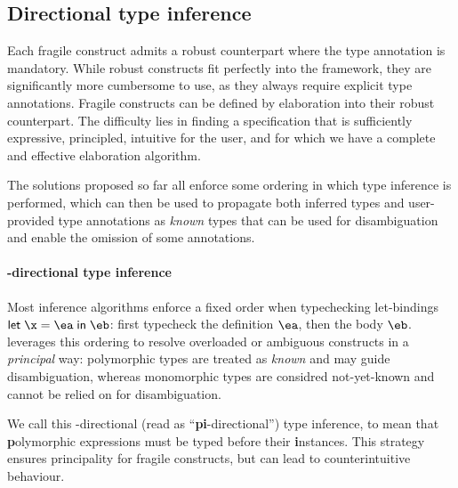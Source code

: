 \documentclass[acmsmall,screen,nonacm,review]{acmart}
\begin{document}
\subsection{Directional type inference}

Each fragile construct admits
a robust counterpart where the type annotation is mandatory. While
robust constructs fit perfectly into the \ML framework, they are
significantly more cumbersome to use, as they always require explicit type
annotations. Fragile constructs can be defined by elaboration into their
robust counterpart.
%
%
The difficulty lies in finding a specification
that is sufficiently expressive, principled, intuitive for the user,
and for which we have a complete and effective elaboration algorithm.

The solutions proposed so far all enforce some ordering in which type
inference is performed, which can then be used to propagate both inferred
types and user-provided type annotations as \emph{known} types that can be
used for disambiguation and enable the omission of some annotations.


\paragraph{\Geninst-directional type inference}


Most \ML inference algorithms enforce a fixed order when typechecking
let-bindings $\elet \x \ea \eb$: first typecheck the definition $\ea$, then
the body $\eb$. \OCaml leverages this ordering to resolve overloaded or
ambiguous constructs in a \emph{principal} way: polymorphic types
are treated as \emph{known} and may guide disambiguation, whereas monomorphic
types are considred not-yet-known and cannot be relied on for disambiguation.


We call this \textbf{\geninst}-directional (read as
``\textbf{pi}-directional'') type inference, to mean that \textbf{p}olymorphic
expressions must be typed before their \textbf{i}nstances. This strategy
ensures principality for fragile constructs, but can lead to counterintuitive
behaviour.

\end{document}
